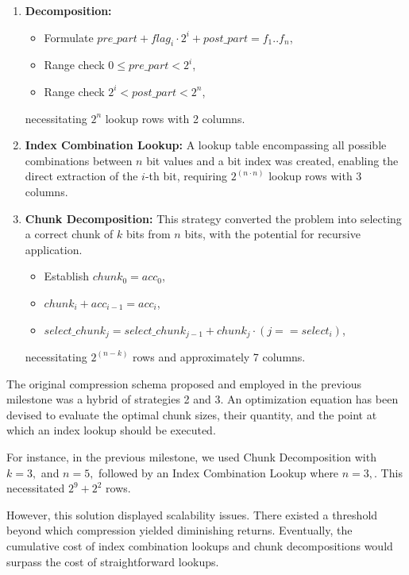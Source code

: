 \documentclass{article}[12pt]
\begin{document}
\begin{enumerate}
    \item \textbf{Decomposition:}
    \begin{itemize}
        \item Formulate \( pre\_part + flag_i \cdot 2^i + post\_part = f_1..f_n \),
        \item Range check \( 0 \leq pre\_part < 2^i \),
        \item Range check \( 2^i < post\_part < 2^n \),
    \end{itemize}
    necessitating \( 2^n \) lookup rows with 2 columns.

    \item \textbf{Index Combination Lookup:}
    A lookup table encompassing all possible combinations between \( n \) bit values and a bit index was created, enabling the direct extraction of the \( i \)-th bit, requiring \( 2^{(n \cdot n)} \) lookup rows with 3 columns.

    \item \textbf{Chunk Decomposition:}
    This strategy converted the problem into selecting a correct chunk of \( k \) bits from \( n \) bits, with the potential for recursive application.
    \begin{itemize}
        \item Establish \( chunk_0 = acc_0 \),
        \item \( chunk_i + acc_{i-1} = acc_i \),
        \item \( select\_chunk_j = select\_chunk_{j-1} + chunk_j \cdot (j == select_i) \),
    \end{itemize}
    necessitating \( 2^{(n-k)} \) rows and approximately 7 columns.
\end{enumerate}

The original compression schema proposed and employed in the previous milestone was a hybrid of strategies 2 and 3.
An optimization equation has been devised to evaluate the optimal chunk sizes, their quantity, and the point at which an index lookup should be executed.

For instance, in the previous milestone, we used Chunk Decomposition with \( k = 3, \) and \( n = 5, \) followed by an Index Combination Lookup where \( n = 3, \).
This necessitated \( 2^9 + 2^2 \) rows.

However, this solution displayed scalability issues.
There existed a threshold beyond which compression yielded diminishing returns.
Eventually, the cumulative cost of index combination lookups and chunk decompositions would surpass the cost of straightforward lookups.
\end{document}
